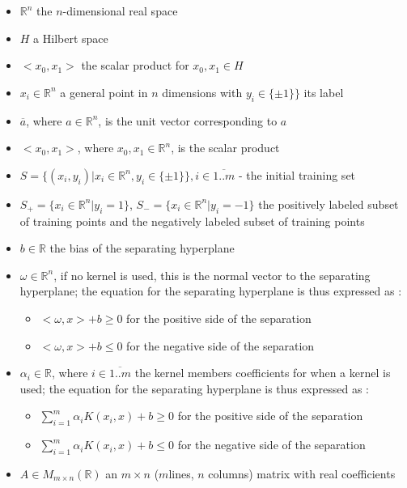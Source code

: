 \documentclass[a4paper,twoside,10pt]{report}
\begin{document}
	\begin{itemize}
		\item \(\mathbb{R}^n\) the \(n\)-dimensional real space
		\item \(H\) a Hilbert space
		\item \(<x_0, x_1>\) the scalar product for \(x_0, x_1\in H\)
		\item \(x_i \in \mathbb{R}^n\) a general point in \(n\) dimensions with \(y_i\in \{\pm 1\} \}\) its label
		\item \(\overline{a}\), where \(a\in\mathbb{R}^n\), is the unit vector corresponding to \(a\)
		\item \(<x_0, x_1>\), where \(x_0, x_1 \in \mathbb{R}^n\), is the scalar product
		\item \(S = \{(x_i, y_i) | x_i \in \mathbb{R}^n, y_i\in \{\pm 1\} \}, i\in \overline{1..m}\) - the initial training set
		\item \(S_+ = \{x_i\in \mathbb{R}^n | y_i = 1 \} \), \(S_- = \{x_i\in \mathbb{R}^n | y_i = -1 \} \) the positively labeled subset of 
							training points and the negatively labeled subset of training points
		\item \(b\in \mathbb{R}\) the bias of the separating hyperplane
		\item \(\omega \in \mathbb{R}^n\), if no kernel is used, this is the normal vector to the separating hyperplane; the equation for the separating 
							hyperplane is thus expressed as :
							\begin{itemize}
								\item \(<\omega, x> + b \geq 0\) for the positive side of the separation
								\item \(<\omega, x> + b \leq 0\) for the negative side of the separation
							\end{itemize}
		\item \(\alpha_i \in \mathbb{R}\), where \(i\in\overline{1..m}\) the kernel members coefficients for when a kernel is used; the equation for the separating 
							hyperplane is thus expressed as :
							\begin{itemize}
								\item \(\sum^m_{i=1}{\alpha_i K(x_i, x)} + b \geq 0\) for the positive side of the separation
								\item \(\sum^m_{i=1}{\alpha_i K(x_i, x)} + b \leq 0\) for the negative side of the separation
							\end{itemize}
							
		\item	\(A\in M_{m\times n}(\mathbb{R})\) an \(m\times n\) (\(m\)lines, \(n\) columns) matrix with real coefficients
	\end{itemize}
	
\end{document}
